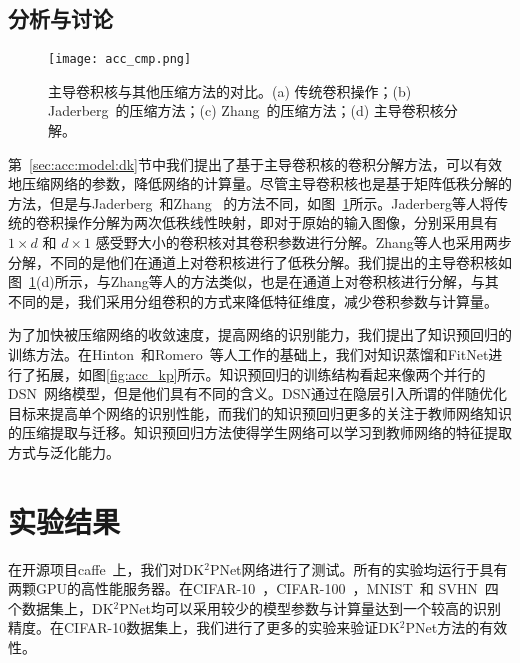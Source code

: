 \subsection{分析与讨论}
\label{sec:acc:model:discuss}

\begin{figure}
\begin{center}
\centerline{\texttt{[image: acc\_cmp.png]}}
\caption{主导卷积核与其他压缩方法的对比。(a) 传统卷积操作；(b) Jaderberg~\cite{jaderberg2014speeding}的压缩方法；(c) Zhang~\cite{zhang2015efficient}的压缩方法；(d) 主导卷积核分解。}
\label{fig:acc_cmp}
\end{center}
\end{figure} 

第~\ref{sec:acc:model:dk}节中我们提出了基于主导卷积核的卷积分解方法，可以有效地压缩网络的参数，降低网络的计算量。尽管主导卷积核也是基于矩阵低秩分解的方法，但是与Jaderberg~\cite{jaderberg2014speeding}和Zhang~\cite{zhang2015efficient} 的方法不同，如图~\ref{fig:acc_cmp}所示。Jaderberg等人将传统的卷积操作分解为两次低秩线性映射，即对于原始的输入图像，分别采用具有 $1{\times}d$ 和 $d{\times}1$ 感受野大小的卷积核对其卷积参数进行分解。Zhang等人也采用两步分解，不同的是他们在通道上对卷积核进行了低秩分解。我们提出的主导卷积核如图~\ref{fig:acc_cmp}(d)所示，与Zhang等人的方法类似，也是在通道上对卷积核进行分解，与其不同的是，我们采用分组卷积的方式来降低特征维度，减少卷积参数与计算量。

为了加快被压缩网络的收敛速度，提高网络的识别能力，我们提出了知识预回归的训练方法。在Hinton~\cite{hinton2015distilling}和Romero~\cite{romero2014fitnets}等人工作的基础上，我们对知识蒸馏和FitNet进行了拓展，如图\ref{fig:acc_kp}所示。知识预回归的训练结构看起来像两个并行的DSN~\cite{lee2015deeply}网络模型，但是他们具有不同的含义。DSN通过在隐层引入所谓的伴随优化目标来提高单个网络的识别性能，而我们的知识预回归更多的关注于教师网络知识的压缩提取与迁移。知识预回归方法使得学生网络可以学习到教师网络的特征提取方式与泛化能力。

\section{实验结果}
\label{sec:acc:experiment}

在开源项目caffe~\cite{jia2014caffe}上，我们对DK$^2$PNet网络进行了测试。所有的实验均运行于具有两颗GPU的高性能服务器。在CIFAR-10~\cite{krizhevsky2009learning}，CIFAR-100~\cite{krizhevsky2009learning}，MNIST~\cite{lecun1998gradient}和 SVHN~\cite{netzer2011reading}四个数据集上，DK$^2$PNet均可以采用较少的模型参数与计算量达到一个较高的识别精度。在CIFAR-10数据集上，我们进行了更多的实验来验证DK$^2$PNet方法的有效性。


